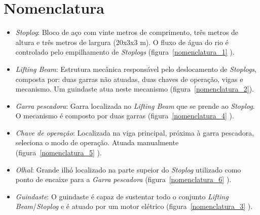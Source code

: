 

\section{Nomenclatura}
\begin{itemize}

\item \emph{Stoplog}: Bloco de aço com vinte metros de comprimento, três metros
de altura e três metros de largura (20x3x3 m). O fluxo de água do rio é
controlado pelo empilhamento de \emph{Stoplogs} (figura~\ref{nomenclatura_1} ).


\item \emph{Lifting Beam}: Estrutura mecânica responsável pelo deslocamento de
\emph{Stoplogs}, composta por: duas garras não atuadas, duas chaves de operação, vigas e mecanismo. Um guindaste atua neste mecanismo (figura~\ref{nomenclatura_2}).

\item \emph{Garra pescadora}: Garra localizada no \emph{Lifting Beam} que se
prende ao \emph{Stoplog}. O mecanismo é composto por duas garras (figura~\ref{nomenclatura_4} ).

\item \emph{Chave de operação}: Localizada na viga principal, próxima à garra
pescadora, seleciona o modo de operação.  Atuada manualmente (figura~\ref{nomenclatura_5} ).

\item \emph{Olhal}: Grande ilhó localizado na parte supeior do \emph{Stoplog}
utilizado como ponto de encaixe para a \emph{Garra pescadora}
(figura~\ref{nomenclatura_6} ).

\item \emph{Guindaste}: O guindaste é capaz de sustentar todo o conjunto
\emph{Lifting Beam}/\emph{Stoplog} e é atuado por um motor elétrico
(figura~\ref{nomenclatura_3} ).

\end{itemize}

